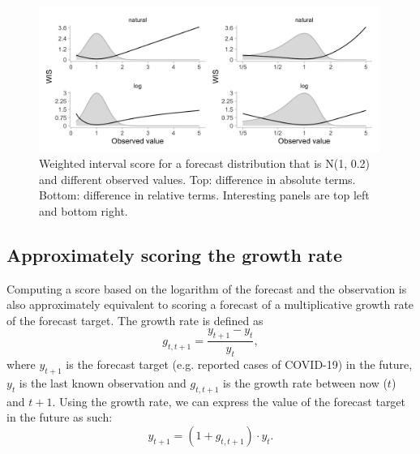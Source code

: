 \documentclass{article}
\begin{document}
\begin{figure}[h!]
    \centering
    \includegraphics[width=0.99\textwidth]{output/figures/SIM-effect-log-score.png}
    \caption{Weighted interval score for a forecast distribution that is N(1, 0.2) and different observed values. Top: difference in absolute terms. Bottom: difference in relative terms. Interesting panels are top left and bottom right.} 
    \label{fig:change-in-scores}
\end{figure}

\subsection{Approximately scoring the growth rate}
Computing a score based on the logarithm of the forecast and the observation is also approximately equivalent to scoring a forecast of a multiplicative growth rate of the forecast target. The growth rate is defined as
%
\begin{equation}
    g_{t, t+1} = \frac{y_{t+1} - y_t}{y_t},
\end{equation}
%
where $y_{t+1}$ is the forecast target (e.g. reported cases of COVID-19) in the future, $y_t$ is the last known observation and $g_{t, t+1}$ is the growth rate between now ($t$) and $t+1$. 
Using the growth rate, we can express the value of the forecast target in the future as such: 
%
\begin{equation}
y_{t+1} = (1 + g_{t, t+1}) \cdot y_t.
\end{equation}
%
\end{document}
